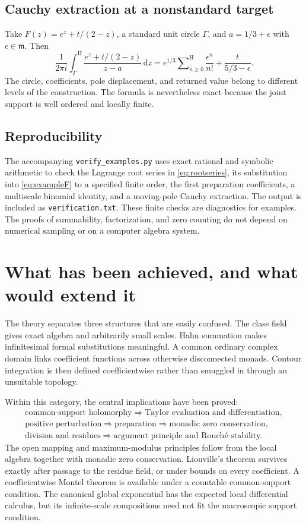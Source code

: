 \documentclass[11pt,oneside]{article}
\theoremstyle{definition}\newtheorem{definition}[theorem]{Definition}
\newcommand{\mm}{\mathfrak m}
\newcommand{\dd}{\,\mathrm d}
\newcommand{\Hsum}{\mathop{\sum}\nolimits^{\mathrm H}}
\newcommand{\htop}{\mathrm H}
\begin{document}
\subsection{Cauchy extraction at a nonstandard target}
Take $F(z)=e^z+t/(2-z)$, a standard unit circle $\Gamma$, and $a=1/3+\epsilon$ with $\epsilon\in\mm$. Then
\[
 \frac1{2\pi i}\int_\Gamma^{\htop}
    \frac{e^z+t/(2-z)}{z-a}\dd z
 =e^{1/3}\Hsum_{n\geq0}\frac{\epsilon^n}{n!}
  +\frac{t}{5/3-\epsilon}.
\]
The circle, coefficients, pole displacement, and returned value belong to different levels of the construction. The formula is nevertheless exact because the joint support is well ordered and locally finite.

\subsection{Reproducibility}
The accompanying \texttt{verify\_examples.py} uses exact rational and symbolic arithmetic to check the Lagrange root series in \eqref{eq:rootseries}, its substitution into \eqref{eq:exampleF} to a specified finite order, the first preparation coefficients, a multiscale binomial identity, and a moving-pole Cauchy extraction. The output is included as \texttt{verification.txt}. These finite checks are diagnostics for examples. The proofs of summability, factorization, and zero counting do not depend on numerical sampling or on a computer algebra system.

\section{What has been achieved, and what would extend it}\label{sec:conclusion}
The theory separates three structures that are easily confused. The class field gives exact algebra and arbitrarily small scales. Hahn summation makes infinitesimal formal substitutions meaningful. A common ordinary complex domain links coefficient functions across otherwise disconnected monads. Contour integration is then defined coefficientwise rather than smuggled in through an unsuitable topology.

Within this category, the central implications have been proved:
\[
 \begin{gathered}
 \text{common-support holomorphy}
 \Longrightarrow\text{Taylor evaluation and differentiation},\\
 \text{positive perturbation}
 \Longrightarrow\text{preparation}
 \Longrightarrow\text{monadic zero conservation},\\
 \text{division and residues}
 \Longrightarrow\text{argument principle and Rouch\'e stability}.
 \end{gathered}
\]
The open mapping and maximum-modulus principles follow from the local algebra together with monadic zero conservation. Liouville's theorem survives exactly after passage to the residue field, or under bounds on every coefficient. A coefficientwise Montel theorem is available under a countable common-support condition. The canonical global exponential has the expected local differential calculus, but its infinite-scale compositions need not fit the macroscopic support condition.
\end{document}
